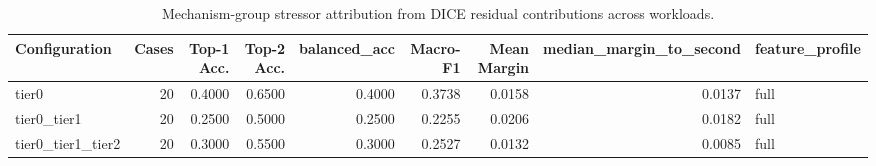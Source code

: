 \begin{table}[t]
\centering
\caption{Mechanism-group stressor attribution from DICE residual contributions across workloads.}
\label{tab:dice_stressor_diagnosis}
\footnotesize
\begin{tabular}{lrrrrrrrl}
\toprule
Configuration & Cases & Top-1 Acc. & Top-2 Acc. & balanced_acc & Macro-F1 & Mean Margin & median_margin_to_second & feature_profile \\
\midrule
tier0 & 20 & 0.4000 & 0.6500 & 0.4000 & 0.3738 & 0.0158 & 0.0137 & full \\
tier0_tier1 & 20 & 0.2500 & 0.5000 & 0.2500 & 0.2255 & 0.0206 & 0.0182 & full \\
tier0_tier1_tier2 & 20 & 0.3000 & 0.5500 & 0.3000 & 0.2527 & 0.0132 & 0.0085 & full \\
\bottomrule
\end{tabular}

\end{table}
